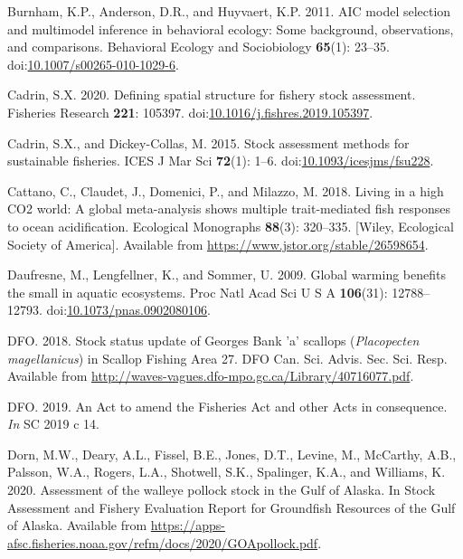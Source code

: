 \documentclass[
]{article}
\newlength{\cslhangindent}
\newlength{\cslentryspacingunit} %
\newenvironment{CSLReferences}[2] %
 {%
  \setlength{\parindent}{0pt}
  \ifodd #1
  \let\oldpar\par
  \def\par{\hangindent=\cslhangindent\oldpar}
  \fi
  \setlength{\parskip}{#2\cslentryspacingunit}
 }%
 {}
\begin{document}
\begin{CSLReferences}{1}{0}
\leavevmode{}%
Burnham, K.P., Anderson, D.R., and Huyvaert, K.P. 2011. {AIC} model selection and multimodel inference in behavioral ecology: Some background, observations, and comparisons. Behavioral Ecology and Sociobiology \textbf{65}(1): 23--35. doi:\href{https://doi.org/10.1007/s00265-010-1029-6}{10.1007/s00265-010-1029-6}.

\leavevmode{}%
Cadrin, S.X. 2020. Defining spatial structure for fishery stock assessment. Fisheries Research \textbf{221}: 105397. doi:\href{https://doi.org/10.1016/j.fishres.2019.105397}{10.1016/j.fishres.2019.105397}.

\leavevmode{}%
Cadrin, S.X., and Dickey-Collas, M. 2015. Stock assessment methods for sustainable fisheries. ICES J Mar Sci \textbf{72}(1): 1--6. doi:\href{https://doi.org/10.1093/icesjms/fsu228}{10.1093/icesjms/fsu228}.

\leavevmode{}%
Cattano, C., Claudet, J., Domenici, P., and Milazzo, M. 2018. Living in a high {CO2} world: A global meta-analysis shows multiple trait-mediated fish responses to ocean acidification. Ecological Monographs \textbf{88}(3): 320--335. {{[}Wiley, Ecological Society of America{]}}. Available from \url{https://www.jstor.org/stable/26598654}.

\leavevmode{}%
Daufresne, M., Lengfellner, K., and Sommer, U. 2009. Global warming benefits the small in aquatic ecosystems. Proc Natl Acad Sci U S A \textbf{106}(31): 12788--12793. doi:\href{https://doi.org/10.1073/pnas.0902080106}{10.1073/pnas.0902080106}.

\leavevmode{}%
DFO. 2018. Stock status update of {Georges Bank} 'a' scallops ({\emph{Placopecten}} {\emph{magellanicus}}) in {Scallop Fishing Area} 27. DFO Can. Sci. Advis. Sec. Sci. Resp. Available from \url{http://waves-vagues.dfo-mpo.gc.ca/Library/40716077.pdf}.

\leavevmode{}%
DFO. 2019. An {Act} to amend the {Fisheries Act} and other {Acts} in consequence. \emph{In} SC 2019 c 14.

\leavevmode{}%
Dorn, M.W., Deary, A.L., Fissel, B.E., Jones, D.T., Levine, M., McCarthy, A.B., Palsson, W.A., Rogers, L.A., Shotwell, S.K., Spalinger, K.A., and Williams, K. 2020. Assessment of the walleye pollock stock in the {Gulf} of {Alaska}. {In Stock Assessment} and {Fishery Evaluation Report} for {Groundfish Resources} of the {Gulf} of {Alaska}. Available from \url{https://apps-afsc.fisheries.noaa.gov/refm/docs/2020/GOApollock.pdf}.


\end{CSLReferences}
\end{document}
